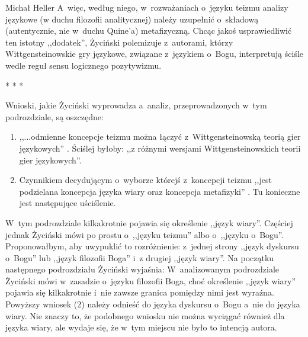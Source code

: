 \begin{artplenv}{Michał Heller}
A~więc, według niego, w~rozważaniach o~języku teizmu analizy językowe (w duchu filozofii analitycznej) należy uzupełnić o~składową (autentycznie, nie w~duchu Quine'a) metafizyczną. Chcąc jakoś usprawiedliwić ten istotny ,,dodatek'', Życiński polemizuje z~autorami, którzy Wittgensteinowskie gry językowe, związane z~językiem o~Bogu, interpretują ściśle wedle reguł sensu logicznego pozytywizmu.


\begin{center}
* * *
\end{center}


Wnioski, jakie Życiński wyprowadza a~analiz, przeprowadzonych w~tym podrozdziale, są oszczędne:

\begin{enumerate}
\item ,,...odmienne koncepcje teizmu można łączyć z~Wittgensteinowską teorią gier językowych''
\parencite[][s.~22]{zycinski_teizm_1985}. %
 Ściślej byłoby: ,,z różnymi wersjami Wittgensteinowskich teorii gier językowych''.
\item Czynnikiem decydującym o~wyborze którejś z~koncepcji teizmu ,,jest podzielana koncepcja języka wiary oraz koncepcja metafizyki''
\parencite[][s.~22]{zycinski_teizm_1985}. %
 Tu konieczne jest następujące uściślenie.
\end{enumerate}
W~tym podrozdziale kilkakrotnie pojawia się określenie ,,język wiary''. Częściej jednak Życiński mówi po prostu o~,,języku teizmu'' albo o~,,języku o~Bogu''. Proponowałbym, aby uwypuklić to rozróżnienie: z~jednej strony ,,język dyskursu o~Bogu'' lub ,,język filozofii Boga'' i~z drugiej ,,język wiary''. Na początku następnego podrozdziału Życiński wyjaśnia: 
 W~analizowanym podrozdziale Życiński mówi w~zasadzie o~języku filozofii Boga, choć określenie ,,język wiary'' pojawia się kilkakrotnie i~nie zawsze granica pomiędzy nimi jest wyraźna. Powyższy wniosek (2) należy odnieść do języka dyskursu o~Bogu a~nie do języka wiary. Nie znaczy to, że podobnego wniosku nie można wyciągać również dla języka wiary, ale wydaje się, że w~tym miejscu nie było to intencją autora.


\end{artplenv}
